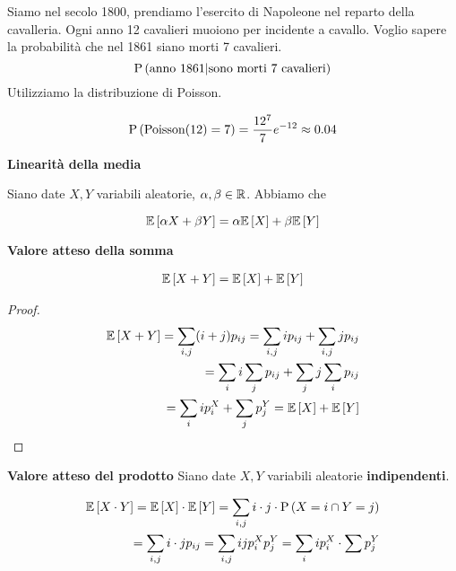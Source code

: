 \begin{exmp}
	Siamo nel secolo 1800, prendiamo l'esercito di Napoleone nel reparto della cavalleria. Ogni anno 12 cavalieri muoiono per incidente a cavallo. Voglio sapere la probabilità che nel 1861 siano morti 7 cavalieri.
	\begin{equation*}
	\text{P}\left(\text{anno } 1861 | \text{sono morti 7 cavalieri}\right)
	\end{equation*}
	Utilizziamo la distribuzione di Poisson.
	
	\begin{equation*}
	\text{P}\left(\text{Poisson}(12) = 7\right) = \dfrac{12^7}{7}e^{-12} \approx 0.04
	\end{equation*}
	
\end{exmp}

\begin{defn}
	\textbf{Linearità della media}
	
	Siano date $ X,Y $ variabili aleatorie, $ \alpha ,\beta \in \mathbb{R} $. Abbiamo che
	
	\begin{equation*}
	\mathbb{E}\left[\alpha X + \beta Y\right] = \alpha \mathbb{E}\left[X\right] + \beta \mathbb{E}\left[Y\right]
	\end{equation*}
\end{defn}


\begin{defn}
	\textbf{Valore atteso della somma}
	
	\begin{equation}
	\begin{aligned}
	\mathbb{E}\left[X+Y\right] = \mathbb{E}\left[X\right] + \mathbb{E}\left[Y\right]
	\end{aligned}
	\end{equation}
	
	\begin{proof}
		\begin{equation*}
		\begin{aligned}
		\mathbb{E}\left[X+Y\right] = \sum_{i,j} (i+j)p_{ij} = \sum_{i,j} ip_{ij} + \sum_{i,j} jp_{ij} \\
		= \sum_i i \sum_j p_{ij} + \sum_j j \sum_i p_{ij} \\
		= \sum_i i p_i^X + \sum_j p_j^Y = \mathbb{E}\left[X\right] + \mathbb{E}\left[Y\right]
		\end{aligned}
		\end{equation*}
	\end{proof}

\end{defn}

\begin{defn}
	\textbf{Valore atteso del prodotto}
	Siano date $ X,Y $ variabili aleatorie \textbf{indipendenti}.
	
	\begin{equation*}
	\begin{aligned}
	\mathbb{E}\left[X \cdot Y\right] = \mathbb{E}\left[X\right] \cdot \mathbb{E}\left[Y\right] = \sum_{i,j} i \cdot j \cdot \text{P}\left(X = i \cap Y =j\right) \\
	= \sum_{i,j} i \cdot j p_{ij} = \sum_{i,j} ij p_i^X p_j^Y =  \sum_{i} i p_i^X \cdot \sum p_j^Y
	\end{aligned}
	\end{equation*}
\end{defn}


